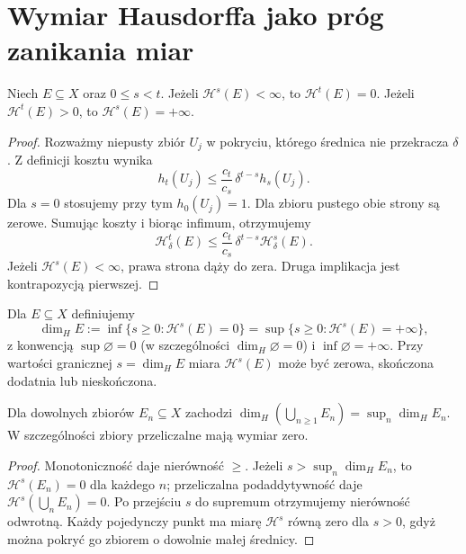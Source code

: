 \section{Wymiar Hausdorffa jako próg zanikania miar}
\begin{lemat}
\label{lem:hausdorff-threshold-26}
Niech $E\subseteq X$ oraz $0\le s<t$. Jeżeli
$\mathcal H^s(E)<\infty$, to $\mathcal H^t(E)=0$.
Jeżeli $\mathcal H^t(E)>0$, to $\mathcal H^s(E)=+\infty$.
\end{lemat}
\begin{proof}
Rozważmy niepusty zbiór $U_j$ w pokryciu,
którego średnica nie przekracza $\delta$.
Z definicji kosztu wynika
\[
 h_t(U_j)\le\frac{c_t}{c_s}\,\delta^{t-s}h_s(U_j).
\]
Dla $s=0$ stosujemy przy tym $h_0(U_j)=1$.
Dla zbioru pustego obie strony są zerowe.
Sumując koszty i biorąc infimum, otrzymujemy
\[
\mathcal H^t_\delta(E)\le
\frac{c_t}{c_s}\,\delta^{t-s}\mathcal H^s_\delta(E).
\]
Jeżeli $\mathcal H^s(E)<\infty$, prawa strona dąży
do zera. Druga implikacja jest kontrapozycją pierwszej.
\end{proof}

\begin{definicja}
\label{def:hausdorff-dimension-26}
Dla $E\subseteq X$ definiujemy
\[
 \dim_H E:=\inf\{s\ge0:\mathcal H^s(E)=0\}
 =\sup\{s\ge0:\mathcal H^s(E)=+\infty\},
\]
z konwencją $\sup\varnothing=0$ (w szczególności
$\dim_H\varnothing=0$) i $\inf\varnothing=+\infty$.
Przy wartości granicznej $s=\dim_H E$ miara
$\mathcal H^s(E)$ może być zerowa, skończona dodatnia
lub nieskończona.
\end{definicja}

\begin{wniosek}
\label{cor:hausdorff-union-26}
Dla dowolnych zbiorów $E_n\subseteq X$ zachodzi
$\dim_H(\bigcup_{n\ge1}E_n)=\sup_n\dim_HE_n$.
W szczególności zbiory przeliczalne mają wymiar zero.
\end{wniosek}
\begin{proof}
Monotoniczność daje nierówność $\ge$.
Jeżeli $s>\sup_n\dim_HE_n$, to
$\mathcal H^s(E_n)=0$ dla każdego $n$; przeliczalna
podaddytywność daje $\mathcal H^s(\bigcup_nE_n)=0$.
Po przejściu $s$ do supremum otrzymujemy nierówność
odwrotną. Każdy pojedynczy punkt ma miarę
$\mathcal H^s$ równą zero dla $s>0$, gdyż można
pokryć go zbiorem o dowolnie małej średnicy.
\end{proof}

